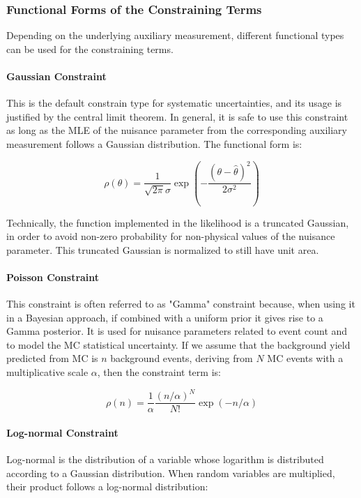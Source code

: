 \subsubsection*{Functional Forms of the Constraining Terms}

Depending on the underlying auxiliary measurement, different functional types can be used for the constraining terms.

\paragraph{Gaussian Constraint}

This is the default constrain type for systematic uncertainties, and its usage is justified by the central limit theorem. In general, it is safe to use this constraint as long as the MLE of the nuisance parameter from the corresponding auxiliary measurement follows a Gaussian distribution. The functional form is:

\begin{equation}
\label{eq:stat:gauss}
\rho( \theta) = \frac{1}{\sqrt{2\pi}\sigma}\exp\left( -\frac{(\theta - \hat{\theta})^2}{2\sigma^2} \right)
\end{equation}

\noindent Technically, the function implemented in the likelihood is a truncated Gaussian, in order to avoid non-zero probability for non-physical values of the nuisance parameter. This truncated Gaussian is normalized to still have unit area.

\paragraph{Poisson Constraint}

This constraint is often referred to as "Gamma" constraint because, when using it in a Bayesian approach, if combined with a uniform prior it gives rise to a Gamma posterior. It is used for nuisance parameters related to event count and to model the MC statistical uncertainty. If we assume that the background yield predicted from MC is $n$ background events, deriving from $N$ MC events with a multiplicative scale $\alpha$, then the constraint term is:

\begin{equation}
\label{eq:stat:poisson}
\rho(n) = \frac{1}{\alpha} \frac{(n/\alpha)^N}{N!} \exp\left( -n/\alpha \right)
\end{equation}

\paragraph{Log-normal Constraint} Log-normal is the distribution of a variable whose logarithm is distributed according to a Gaussian distribution. When random variables are multiplied, their product follows a log-normal distribution:

